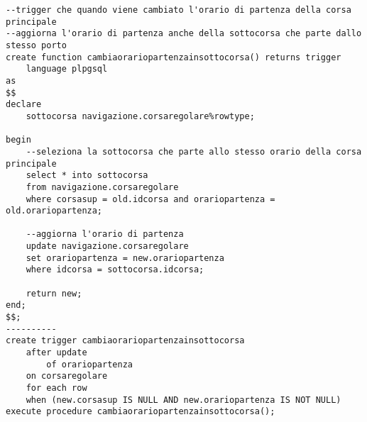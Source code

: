 \begin{lstlisting}[style=sqlstyle]
--trigger che quando viene cambiato l'orario di partenza della corsa principale
--aggiorna l'orario di partenza anche della sottocorsa che parte dallo stesso porto
create function cambiaorariopartenzainsottocorsa() returns trigger
    language plpgsql
as
$$
declare
    sottocorsa navigazione.corsaregolare%rowtype;

begin
    --seleziona la sottocorsa che parte allo stesso orario della corsa principale
    select * into sottocorsa
    from navigazione.corsaregolare
    where corsasup = old.idcorsa and orariopartenza = old.orariopartenza;

    --aggiorna l'orario di partenza
    update navigazione.corsaregolare
    set orariopartenza = new.orariopartenza
    where idcorsa = sottocorsa.idcorsa;

    return new;
end;
$$;
----------
create trigger cambiaorariopartenzainsottocorsa
    after update
        of orariopartenza
    on corsaregolare
    for each row
    when (new.corsasup IS NULL AND new.orariopartenza IS NOT NULL)
execute procedure cambiaorariopartenzainsottocorsa();

\end{lstlisting}

